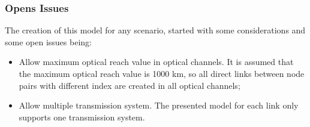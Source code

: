 \vspace{13pt}
\subsubsection{Opens Issues}

The creation of this model for any scenario, started with some considerations and some open issues being:

\begin{itemize}
  \item Allow maximum optical reach value in optical channels.
  \subitem It is assumed that the maximum optical reach value is 1000 km, so all direct links between node pairs with different index are created in all optical channels;
  \item Allow multiple transmission system.
  \subitem The presented model for each link only supports one transmission system.
\end{itemize} 